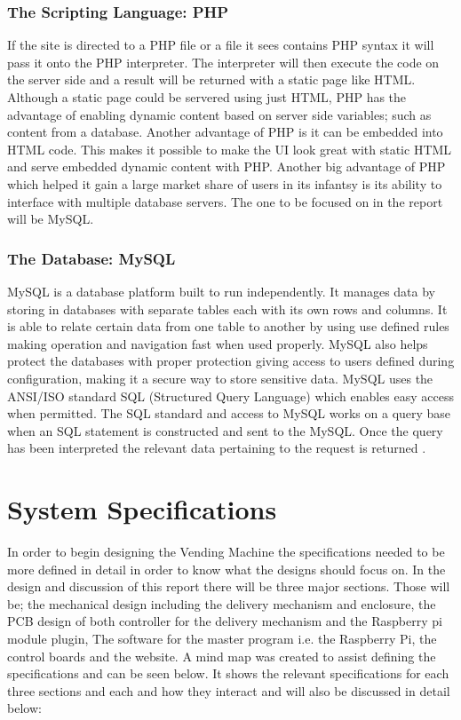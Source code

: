 \documentclass[a4paper,11pt]{article}
\numberwithin{figure}{section}
\begin{document}
\subsubsection{The Scripting Language: PHP}
If the site is directed to a PHP file or a file it sees contains PHP syntax it will pass it onto the PHP interpreter. The interpreter will then execute the code on the server side and a result will be returned with a static page like HTML. Although a static page could be servered using just HTML, PHP has the advantage of enabling dynamic content based on server side variables; such as content from a database. Another advantage of PHP is it can be embedded into HTML code. This makes it possible to make the UI look great with static HTML and serve embedded dynamic content with PHP. Another big advantage of PHP which helped it gain a large market share of users in its infantsy is its ability to interface with multiple database servers. The one to be focused on in the report will be MySQL.


\subsubsection{The Database: MySQL}
MySQL is a database platform built to run independently. It manages data by storing in databases with separate tables each with its own rows and columns. It is able to relate certain data from one table to another by using use defined rules making operation and navigation fast when used properly. MySQL also helps protect the databases with proper protection giving access to users defined during configuration, making it a secure way to store sensitive data. MySQL uses the ANSI/ISO standard SQL (Structured Query Language) which enables easy access when permitted. The SQL standard and access to MySQL works on a query base when an SQL statement is constructed and sent to the MySQL. Once the query has been interpreted the relevant data pertaining to the request is returned \cite{mysql}.  

	\newpage
\section{System Specifications}
In order to begin designing the Vending Machine the specifications needed to be more defined in detail in order to know what the designs should focus on. In the design and discussion of this report there will be three major sections. Those will be; the mechanical design including the delivery mechanism and enclosure, the PCB design of both controller for the delivery mechanism and the Raspberry pi module plugin, The software for the master program i.e. the Raspberry Pi, the control boards and the website. A mind map was created to assist defining the specifications and can be seen below. It shows the relevant specifications for each three sections and each and how they interact and will also be discussed in detail below:
\end{document}

